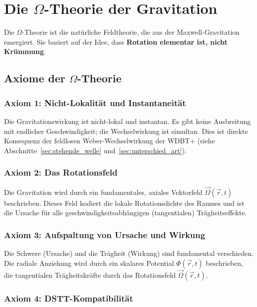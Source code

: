 \section{Die \( \Omega \)-Theorie der Gravitation}
\label{sec:omega_theorie}

Die \( \Omega \)-Theorie ist die natürliche Feldtheorie, die aus der Maxwell-Gravitation emergiert. Sie basiert auf der Idee, dass \textbf{Rotation elementar ist, nicht Krümmung}.

\subsection{Axiome der \( \Omega \)-Theorie}
\label{sub:omega_axiome}

\subsubsection{Axiom 1: Nicht-Lokalität und Instantaneität}
\label{sub:omega_axiom1}

Die Gravitationswirkung ist nicht-lokal und instantan. Es gibt keine Ausbreitung mit endlicher Geschwindigkeit; die Wechselwirkung ist simultan. Dies ist direkte Konsequenz der feldlosen Weber-Wechselwirkung der WDBT+ (siehe Abschnitte~\ref{sec:stehende_welle} und~\ref{sec:unterschied_art}).

\subsubsection{Axiom 2: Das Rotationsfeld}
\label{sub:omega_axiom2}

Die Gravitation wird durch ein fundamentales, axiales Vektorfeld \( \vec{\Omega}(\vec{r}, t) \) beschrieben. Dieses Feld kodiert die lokale Rotationsdichte des Raumes und ist die Ursache für alle geschwindigkeitsabhängigen (tangentialen) Trägheitseffekte.

\subsubsection{Axiom 3: Aufspaltung von Ursache und Wirkung}
\label{sub:omega_axiom3}

Die Schwere (Ursache) und die Trägheit (Wirkung) sind fundamental verschieden. Die radiale Anziehung wird durch ein skalares Potential \( \Phi(\vec{r}, t) \) beschrieben, die tangentialen Trägheitskräfte durch das Rotationsfeld \( \vec{\Omega}(\vec{r}, t) \).

\subsubsection{Axiom 4: DSTT-Kompatibilität}
\label{sub:omega_axiom4}

